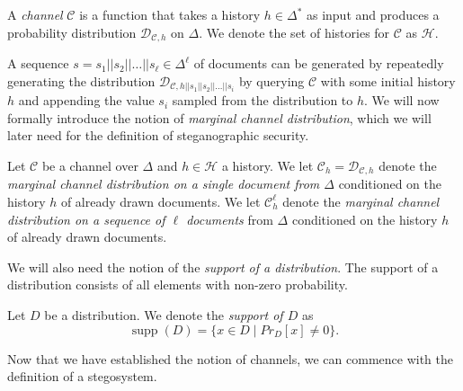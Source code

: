\begin{definition}[Channel]
A \emph{channel} $\mathcal{C}$ is a function that takes a history $h \in \Delta^*$ as input and produces a probability distribution $\mathcal{D}_{\mathcal{C},h}$ on $\Delta$.
We denote the set of histories for $\mathcal{C}$ as $\mathcal{H}$.
\end{definition}

A sequence $s = s_1||s_2||\dots||s_\ell \in \Delta^\ell$ of documents can be generated by repeatedly generating the distribution $\mathcal{D}_{\mathcal{C},h||s_1||s_2||\dots||s_i}$ by querying $\mathcal{C}$ with some initial history $h$ and appending the value $s_i$ sampled from the distribution to $h$.
We will now formally introduce the notion of \emph{marginal channel distribution}, which we will later need for the definition of steganographic security.

\begin{definition}
Let $\mathcal{C}$ be a channel over $\Delta$ and $h \in \mathcal{H}$ a history.
We let $\mathcal{C}_h = \mathcal{D}_{\mathcal{C},h}$ denote the \emph{marginal channel distribution on a single document from $\Delta$} conditioned on the history $h$ of already drawn documents.
We let $\mathcal{C}_h^\ell$ denote the \emph{marginal channel distribution on a sequence of $\ell$ documents} from $\Delta$ conditioned on the history $h$ of already drawn documents.
\end{definition}
We will also need the notion of the \emph{support of a distribution}.
The support of a distribution consists of all elements with non-zero probability.

\begin{definition}[Support]
Let $D$ be a distribution.
We denote the \emph{support of $D$} as 
$$\mathop{supp}(D) = \{ x \in D \mid Pr_{D}[x] \neq 0 \}.$$
\end{definition}

Now that we have established the notion of channels, we can commence with the definition of a stegosystem.

